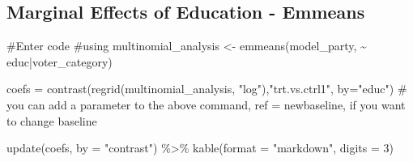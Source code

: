 \documentclass[
  letterpaper,
  DIV=11,
  numbers=noendperiod]{scrartcl}
\newenvironment{Shaded}{\begin{snugshade}}{\end{snugshade}}
\newcommand{\AttributeTok}[1]{\textcolor[rgb]{0.40,0.45,0.13}{#1}}
\newcommand{\CommentTok}[1]{\textcolor[rgb]{0.37,0.37,0.37}{#1}}
\newcommand{\DecValTok}[1]{\textcolor[rgb]{0.68,0.00,0.00}{#1}}
\newcommand{\FunctionTok}[1]{\textcolor[rgb]{0.28,0.35,0.67}{#1}}
\newcommand{\NormalTok}[1]{\textcolor[rgb]{0.00,0.23,0.31}{#1}}
\newcommand{\OtherTok}[1]{\textcolor[rgb]{0.00,0.23,0.31}{#1}}
\newcommand{\SpecialCharTok}[1]{\textcolor[rgb]{0.37,0.37,0.37}{#1}}
\newcommand{\StringTok}[1]{\textcolor[rgb]{0.13,0.47,0.30}{#1}}
\begin{document}
\subsection{Marginal Effects of Education -
Emmeans}\label{marginal-effects-of-education---emmeans}

\begin{Shaded}
\begin{Highlighting}[]
\CommentTok{\#Enter code}
\CommentTok{\#using }
\NormalTok{multinomial\_analysis }\OtherTok{\textless{}{-}} \FunctionTok{emmeans}\NormalTok{(model\_party, }\SpecialCharTok{\textasciitilde{}}\NormalTok{ educ}\SpecialCharTok{|}\NormalTok{voter\_category)}

\NormalTok{coefs }\OtherTok{=} \FunctionTok{contrast}\NormalTok{(}\FunctionTok{regrid}\NormalTok{(multinomial\_analysis, }\StringTok{"log"}\NormalTok{),}\StringTok{"trt.vs.ctrl1"}\NormalTok{,  }\AttributeTok{by=}\StringTok{"educ"}\NormalTok{)}
\CommentTok{\# you can add a parameter to the above command, ref = newbaseline, if you want to change baseline}

\FunctionTok{update}\NormalTok{(coefs, }\AttributeTok{by =} \StringTok{"contrast"}\NormalTok{) }\SpecialCharTok{\%\textgreater{}\%} 
  \FunctionTok{kable}\NormalTok{(}\AttributeTok{format =} \StringTok{"markdown"}\NormalTok{, }\AttributeTok{digits =} \DecValTok{3}\NormalTok{)}
\end{Highlighting}
\end{Shaded}
\end{document}
